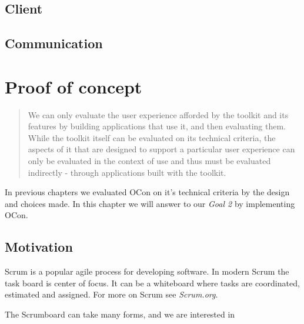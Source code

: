 \documentclass[]{report}
\begin{document}
\section{Client}

\section{Communication}



\chapter{Proof of concept}

\blockquote{
We can only evaluate the user experience afforded by the toolkit and its features by building applications that use it, and then evaluating them. While the toolkit itself can be evaluated on its technical criteria, the aspects of it that are designed to support a particular user experience can only be evaluated in the context of use and thus must be evaluated indirectly - through applications built with the toolkit. \cite{Infrastructure (2003)} \\}

In previous chapters we evaluated OCon on it's technical criteria by the design and choices made. In this chapter we will answer to our \textit{Goal 2} by implementing OCon.

\section{Motivation}




Scrum is a popular agile process for developing software. In modern Scrum the task board is center of focus. It can be a whiteboard where tasks are coordinated, estimated and assigned. For more on Scrum see \textit{Scrum.org}.


The Scrumboard can take many forms, and we are interested in 
\end{document}
